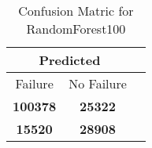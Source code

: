 \begin{table}[] 
\caption{Confusion Matric for RandomForest100} 
\label{Table: Prediction Accuracy-DMDRandomForest100OnlySunEKF-resetReflectionEKF-top2-Reflection} 
\centering 
\begin{tabular} 
 {@{}ccc@{}} 
\toprule 
\multicolumn{2}{c}{\textbf{Predicted}}
 \\ \midrule 
\multicolumn{1}{|c|}{Failure} & 
\multicolumn{1}{c|}{No Failure}
 \\ \midrule 
\multicolumn{1}{|c|}{\color{green}\textbf{100378}} & 
\multicolumn{1}{c|}{\color{red}\textbf{25322}}
 \\ \midrule 
\multicolumn{1}{|c|}{\color{red}\textbf{15520}} & 
\multicolumn{1}{c|}{\color{green}\textbf{28908}}
 \\ \bottomrule 
\end{tabular} 
\end{table} 

